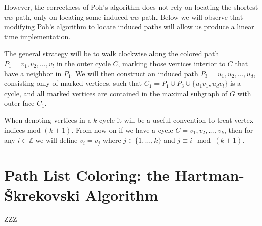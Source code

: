 \documentclass[12pt,letterpaper]{article}
\theoremstyle{plain}
\theoremstyle{definition}
\theoremstyle{break}
\begin{document}
However, the correctness of Poh's algorithm does not rely on
locating the shortest $uw$-path, only on locating some induced $uw$-path.
Below we will observe that modifying Poh's algorithm to locate induced paths will
allow us produce a linear time implementation.

The general strategy will be to walk clockwise along the colored path
$P_1=v_1,v_2,\ldots,v_l$ in the outer cycle $C$, marking those vertices
interior to $C$ that have a neighbor in $P_1$. We will then construct an
induced path $P_3=u_1,u_2,\ldots,u_d$, consisting only of marked vertices,
such that $C_1=P_1\cup P_3\cup\{u_1v_1,u_dv_l\}$ is a cycle, and all marked
vertices are contained in the maximal subgraph of $G$ with outer face $C_1$.

When denoting vertices in a $k$-cycle
it will be a useful convention to treat
vertex indices mod $(k+1)$. From now on if we have a cycle
$C=v_1,v_2,\ldots,v_k$, then for any $i\in\mathbb{Z}$ we will define
$v_i=v_j$ where $j\in\{1,\ldots,k\}$ and $j\equiv i\mod (k+1)$.


\section{Path List Coloring: the Hartman-\v{S}krekovski Algorithm}

ZZZ
\end{document}

